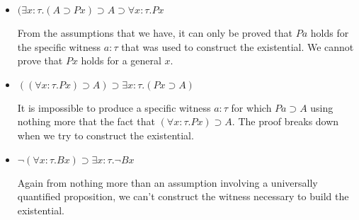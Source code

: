 \documentclass[11pt,letterpaper]{article}
\renewcommand{\implies}{\supset}
\begin{document}
\begin{itemize}
    \item
        $(\exists x : \tau . (A \implies P x)
        \implies A \implies \forall x : \tau . P x$

        From the assumptions that we have, it can only be proved that $P a$
        holds for the specific witness $a : \tau$ that was used to construct
        the existential. We cannot prove that $P x$ holds for a general $x$.

    \item
        $((\forall x : \tau . P x) \implies A)
        \implies \exists x : \tau . (P x \implies A)$

        It is impossible to produce a specific witness $a : \tau$ for which
        $P a \implies A$ using nothing more that the fact that
        $(\forall x : \tau . P x) \implies A$. The proof breaks down when we
        try to construct the existential.

    \item
        $\neg (\forall x : \tau . B x) \implies \exists x : \tau . \neg B x$

        Again from nothing more than an assumption involving a universally
        quantified proposition, we can't construct the witness necessary to
        build the existential.
\end{itemize}
\end{document}
